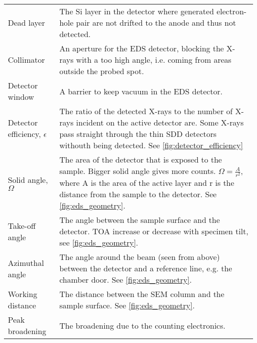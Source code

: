\begin{table}[pht]
\begin{center}
\begin{tabular}{p{2.6cm}p{12cm}}
            Dead layer                      & The Si layer in the detector where generated electron-hole pair are not drifted to the anode and thus not detected.                                                                                                                                 \\
            Collimator                      & An aperture for the EDS detector, blocking the X-rays with a too high angle, i.e. coming from areas outside the probed spot.                                                                                                                        \\
            Detector window                 & A barrier to keep vacuum in the EDS detector.                                                                                                                                                                                                       \\
            Detector efficiency, $\epsilon$ & The ratio of the detected X-rays to the number of X-rays incident on the active detector are. Some X-rays pass straight through the thin SDD detectors withouth being detected. See \cref{fig:detector_efficiency}                                  \\
            Solid angle, $\Omega$           & The area of the detector that is exposed to the sample. Bigger solid angle gives more counts. $\Omega = \frac{A}{r^2}$, where A is the area of the active layer and r is the distance from the sample to the detector. See \cref{fig:eds_geometry}. \\
            Take-off angle                  & The angle between the sample surface and the detector. TOA increase or decrease with specimen tilt, see \cref{fig:eds_geometry}.                                                                                                                    \\
            Azimuthal angle                 & The angle around the beam (seen from above) between the detector and a reference line, e.g. the chamber door.  See \cref{fig:eds_geometry}.                                                                                                         \\
            Working distance                & The distance between the SEM column and the sample surface. See \cref{fig:eds_geometry}.                                                                                                                                                            \\
            Peak broadening                 & The broadening due to the counting electronics.                                                                                                                                                                                                     \\
            \hline
        \end{tabular}
    \end{center}
\end{table}